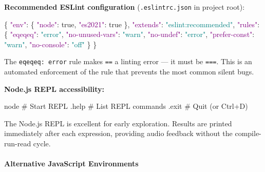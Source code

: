 \documentclass[
  justified,
  openright,
]{tufte-book}
\let\subsubsection\paragraph
\let\paragraph\paragraph
\newcommand{\CommentTok}[1]{\textcolor{MidGray}{#1}}
\newcommand{\DataTypeTok}[1]{\textcolor{Purple}{#1}}
\newcommand{\ExtensionTok}[1]{#1}
\newcommand{\FunctionTok}[1]{\textcolor{BrandBlue}{#1}}
\newcommand{\KeywordTok}[1]{\textcolor{BrandBlue}{#1}}
\newcommand{\StringTok}[1]{\textcolor{Teal}{#1}}
\newenvironment{Shaded}{%
  \begin{snugshade}
}{%
  \end{snugshade}
}
\let\subsubsection\paragraph
\let\paragraph\paragraph
\begin{document}
\textbf{Recommended ESLint configuration} (\texttt{.eslintrc.json} in
project root):

\begin{Shaded}
\begin{Highlighting}[]
\FunctionTok{\{}
  \DataTypeTok{"env"}\FunctionTok{:} \FunctionTok{\{} \DataTypeTok{"node"}\FunctionTok{:} \KeywordTok{true}\FunctionTok{,} \DataTypeTok{"es2021"}\FunctionTok{:} \KeywordTok{true} \FunctionTok{\},}
  \DataTypeTok{"extends"}\FunctionTok{:} \StringTok{"eslint:recommended"}\FunctionTok{,}
  \DataTypeTok{"rules"}\FunctionTok{:} \FunctionTok{\{}
    \DataTypeTok{"eqeqeq"}\FunctionTok{:} \StringTok{"error"}\FunctionTok{,}
    \DataTypeTok{"no{-}unused{-}vars"}\FunctionTok{:} \StringTok{"warn"}\FunctionTok{,}
    \DataTypeTok{"no{-}undef"}\FunctionTok{:} \StringTok{"error"}\FunctionTok{,}
    \DataTypeTok{"prefer{-}const"}\FunctionTok{:} \StringTok{"warn"}\FunctionTok{,}
    \DataTypeTok{"no{-}console"}\FunctionTok{:} \StringTok{"off"}
  \FunctionTok{\}}
\FunctionTok{\}}
\end{Highlighting}
\end{Shaded}

The \texttt{eqeqeq:\ error} rule makes \texttt{==} a linting error ---
it must be \texttt{===}. This is an automated enforcement of the rule
that prevents the most common silent bugs.

\textbf{Node.js REPL accessibility:}

\begin{Shaded}
\begin{Highlighting}[]
\ExtensionTok{node}                      \CommentTok{\# Start REPL}
\ExtensionTok{.help}                     \CommentTok{\# List REPL commands}
\ExtensionTok{.exit}                     \CommentTok{\# Quit (or Ctrl+D)}
\end{Highlighting}
\end{Shaded}

The Node.js REPL is excellent for early exploration. Results are printed
immediately after each expression, providing audio feedback without the
compile-run-read cycle.

\subsubsection{Alternative JavaScript
Environments}\label{alternative-javascript-environments}
\end{document}
